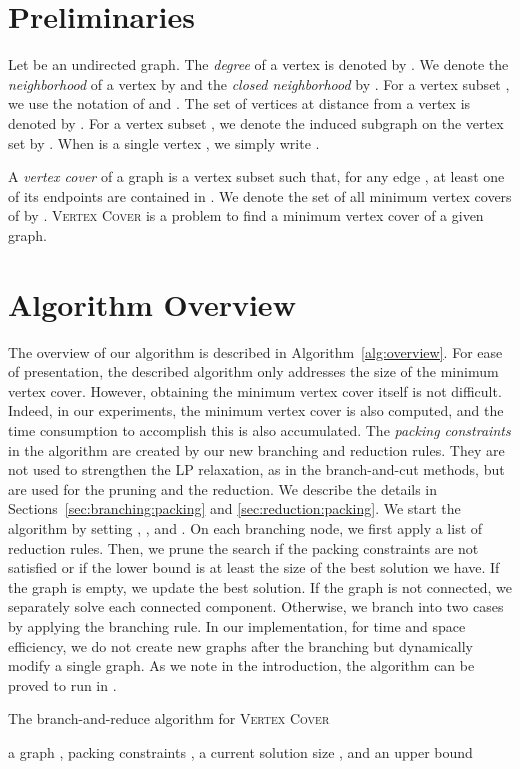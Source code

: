 \documentclass[11pt]{article}
\begin{document}
 \section{Preliminaries}\label{sec:preliminaries}
Let  be an undirected graph.
The \emph{degree} of a vertex  is denoted by .
We denote the \emph{neighborhood} of a vertex  by 
and the \emph{closed neighborhood} by .
For a vertex subset , we use the notation of  and
.
The set of vertices at distance  from a vertex  is denoted by .
For a vertex subset , we denote the induced subgraph on the vertex set  by .
When  is a single vertex , we simply write .

A \emph{vertex cover} of a graph  is a vertex subset  such that, for
any edge , at least one of its endpoints are contained in .
We denote the set of all minimum vertex covers of  by .
\textsc{Vertex Cover} is a problem to find a minimum vertex cover of a given graph.
 \section{Algorithm Overview}\label{sec:overview}
The overview of our algorithm is described in Algorithm~\ref{alg:overview}.
For ease of presentation, the described algorithm only addresses the size of the minimum vertex cover.
However, obtaining the minimum vertex cover itself is not difficult.
Indeed, in our experiments, the minimum vertex cover is also computed,
and the time consumption to accomplish this is also accumulated.
The \emph{packing constraints} in the algorithm are created by our new branching and reduction rules.
They are not used to strengthen the LP relaxation, as in the branch-and-cut methods, but are used for the pruning and the
reduction.
We describe the details in Sections~\ref{sec:branching:packing} and \ref{sec:reduction:packing}.
We start the algorithm by setting , , and .
On each branching node, we first apply a list of reduction rules.
Then, we prune the search if the packing constraints are not satisfied or if the lower bound is
at least the size of the best solution we have.
If the graph is empty, we update the best solution.
If the graph is not connected, we separately solve each connected component.
Otherwise, we branch into two cases by applying the branching rule.
In our implementation, for time and space efficiency, we do not create new graphs after the branching but dynamically modify a
single graph.
As we note in the introduction, the algorithm can be proved to run in .

{
\begin{algorithm}[tb]
\caption{The branch-and-reduce algorithm for \textsc{Vertex Cover}}
\label{alg:overview}
\begin{algorithmic}[1]
\INPUT a graph , packing constraints , a current solution size , and an upper
bound 
\State 
\If{}
	\Return 
\EndIf
\If{}
	\Return 
\EndIf
{}
	\Return 
\EndIf
{}
	\State 
	\ForAll{}
		\State 
	\EndFor
	\State \Return 
\EndIf
\State 
\State 
\State 
\State \Return 
\EndProcedure
\end{algorithmic}
\end{algorithm}
}
\end{document}
